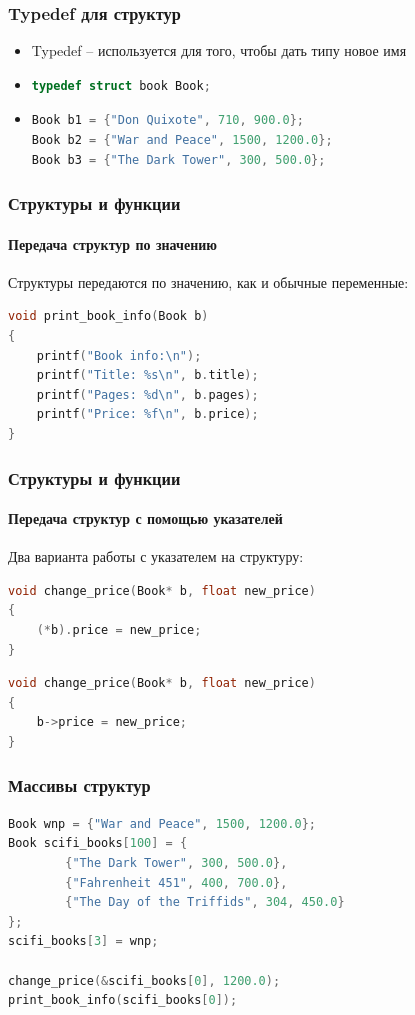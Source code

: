 \documentclass[12pt,pdf,hyperref={unicode}]{beamer}
\begin{document}
\begin{frame}[fragile]
\frametitle{Typedef для структур} 
\begin{itemize}
\item Typedef -- используется для того, чтобы дать типу новое имя \\
\item 
\begin{lstlisting}[language=C++,basicstyle=\ttfamily,keywordstyle=\color{blue}]
typedef struct book Book;
\end{lstlisting}
\item 
\begin{lstlisting}[language=C++,basicstyle=\ttfamily,keywordstyle=\color{blue}]
Book b1 = {"Don Quixote", 710, 900.0};
Book b2 = {"War and Peace", 1500, 1200.0};
Book b3 = {"The Dark Tower", 300, 500.0};
\end{lstlisting}
\end{itemize}
\end{frame}




\begin{frame}[fragile]
\frametitle{Структуры и функции} 
\framesubtitle{Передача структур по значению} 
Структуры передаются по значению, как и обычные переменные:
\begin{lstlisting}[language=C++,basicstyle=\ttfamily,keywordstyle=\color{blue}]
void print_book_info(Book b)
{
    printf("Book info:\n");
    printf("Title: %s\n", b.title);
    printf("Pages: %d\n", b.pages);
    printf("Price: %f\n", b.price);
}
\end{lstlisting}
\end{frame}


\begin{frame}[fragile]
\frametitle{Структуры и функции} 
\framesubtitle{Передача структур с помощью указателей} 
Два варианта работы с указателем на структуру: \\
\begin{lstlisting}[language=C++,basicstyle=\ttfamily,keywordstyle=\color{blue}]
void change_price(Book* b, float new_price)
{
    (*b).price = new_price;
}
\end{lstlisting}
\begin{lstlisting}[language=C++,basicstyle=\ttfamily,keywordstyle=\color{blue}]
void change_price(Book* b, float new_price)
{
    b->price = new_price;
}
\end{lstlisting}
\end{frame}

\begin{frame}[fragile]
\frametitle{Массивы структур} 
\begin{lstlisting}[language=C++,basicstyle=\ttfamily,keywordstyle=\color{blue}]
Book wnp = {"War and Peace", 1500, 1200.0};
Book scifi_books[100] = {
        {"The Dark Tower", 300, 500.0}, 
        {"Fahrenheit 451", 400, 700.0},
        {"The Day of the Triffids", 304, 450.0}
};
scifi_books[3] = wnp;

change_price(&scifi_books[0], 1200.0);
print_book_info(scifi_books[0]);

\end{lstlisting}
\end{frame}

\end{document}

